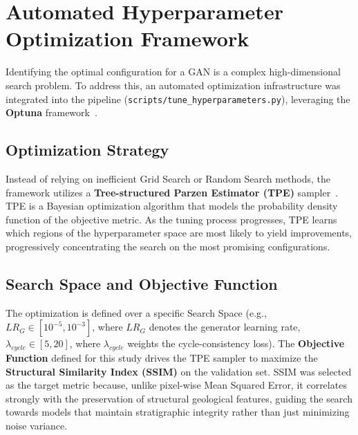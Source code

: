 \section{Automated Hyperparameter Optimization Framework}
\label{sec:hyperparameter_framework}

Identifying the optimal configuration for a GAN is a complex high-dimensional search problem.
To address this, an automated optimization infrastructure was integrated into the pipeline (\texttt{scripts/tune\_hyperparameters.py}), leveraging the \textbf{Optuna} framework~\cite{optuna_2019}.

\subsection{Optimization Strategy}
Instead of relying on inefficient Grid Search or Random Search methods, the framework utilizes a \textbf{Tree-structured Parzen Estimator (TPE)} sampler~\cite{optuna_2019}.
TPE is a Bayesian optimization algorithm that models the probability density function of the objective metric.
As the tuning process progresses, TPE learns which regions of the hyperparameter space are most likely to yield improvements, progressively concentrating the search on the most promising configurations.

\subsection{Search Space and Objective Function}
The optimization is defined over a specific Search Space (e.g., $LR_G \in [10^{-5}, 10^{-3}]$, where $LR_G$ denotes the generator learning rate, $\lambda_{cycle} \in [5, 20]$, where $\lambda_{cycle}$ weights the cycle-consistency loss).
The \textbf{Objective Function} defined for this study drives the TPE sampler to maximize the \textbf{Structural Similarity Index (SSIM)} on the validation set.
SSIM was selected as the target metric because, unlike pixel-wise Mean Squared Error, it correlates strongly with the preservation of structural geological features, guiding the search towards models that maintain stratigraphic integrity rather than just minimizing noise variance.

